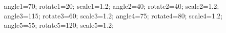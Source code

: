 \documentclass[exercice]{thedocument}%
\begin{document}
%
    \>angle1=70;%
    \>rotate1=20;%
    \>scale1=1.2;%
    \>angle2=40;%
    \>rotate2=40;%
    \>scale2=1.2;%
    \>angle3=115;%
    \>rotate3=60;%
    \>scale3=1.2;%
    \>angle4=75;%
    \>rotate4=80;%
    \>scale4=1.2;%
    \>angle5=55;%
    \>rotate5=120;%
    \>scale5=1.2;%
\end{document}

